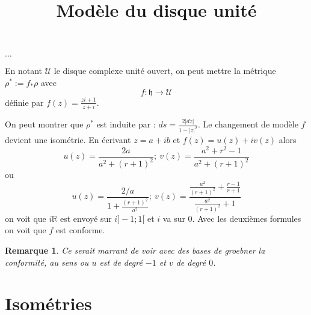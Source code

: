 \documentclass[a4paper,12pt]{article}
\title{Modèle du disque unité}
\date{}
\newcommand{\R}{\mathbb{R}}
\newcommand{\U}{\mathscr{U}}
\newcommand{\h}{\mathfrak{h}}
\theoremstyle{plain}
\newtheorem{rem}{Remarque}
\theoremstyle{definition}
\theoremstyle{remark}
\begin{document}
\maketitle
\tableofcontents

\begin{center}
  $\ldots$
\end{center}
En notant $\U$ le disque complexe unité ouvert, on
peut mettre la métrique $\rho^*:=f_*\rho$ avec 
\[f\colon \h\to \U\]
définie par $f(z)=\frac{zi+1}{z+i}$.

On peut montrer
que $\rho^*$ est induite par : 
$ds=\frac{2|dz|}{1-|z|^2}$. Le changement de modèle $f$
devient une isométrie. En écrivant $z=a+ib$ et
$f(z)=u(z)+iv(z)$ alors
\[u(z)=\frac{2a}{a^2+(r+1)^2};~v(z)=\frac{a^2+r^2-1}{a^2+(r+1)^2}\]
ou
\[u(z)=\frac{2/a}{1+\frac{(r+1)^2}{a^2}};~v(z)=\frac{\frac{a^2}{(r+1)^2}+\frac{r-1}{r+1}}{\frac{a^2}{(r+1)^2}+1}\]
on voit que $i\R$ est envoyé sur $i]-1;1[$ et $i$ va
sur $0$. Avec les deuxièmes formules on voit que 
$f$ est conforme.

\begin{rem}
  Ce serait marrant de voir avec des bases de groebner
  la conformité, au sens ou $u$ est de degré $-1$ et
  $v$ de degré $0$.
\end{rem}


\section{Isométries}

\end{document}
